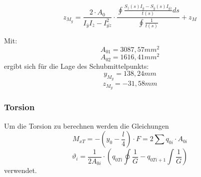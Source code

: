 \begin{equation}
	z_{M_{g}}=
	\frac{2\cdot A_{0}}{I_{\bar{y}}I_{\bar{z}}-I_{\bar{yz}}^2}
	\cdot\frac{
		\oint
		\frac{
			S_{\bar{z}}(s)I_{\bar{y}}-S_{\bar{y}}(s)I_{\bar{yz}}
		}
		{t(s)} ds
	}
	{\oint\frac{1}{t(s)}} +z_{M} 
\end{equation}

Mit:
\begin{equation}
	A_{01}=3087,57mm^2
\end{equation}
\begin{equation}
	A_{02}=1616,41mm^2
\end{equation}
ergibt sich für die Lage des Schubmittelpunkts:
\begin{equation}
	y_{M_{g}}=138,24mm
\end{equation}
\begin{equation}
	z_{M_{g}}=-31,58mm
\end{equation}

\subsubsection{Torsion}
Um die Torsion zu berechnen werden die Gleichungen
\begin{equation}
	M_{xT}=-(y_{0}-\frac{l}{4})\cdot F=2\sum q_{0i}\cdot A_{0i}
\end{equation}
\begin{equation}
	\vartheta_{i}=\frac{1}{2 A_{0i}}\cdot (q_{0Ti}\oint\frac{1}{G}-q_{0Ti+1}\int\frac{1}{G})
\end{equation}
verwendet.











